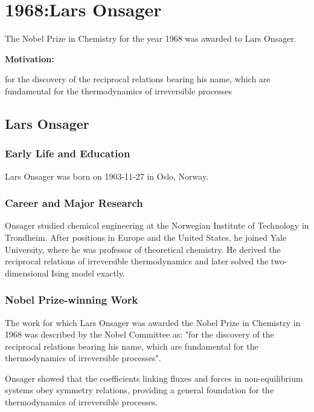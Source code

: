 \chapter{1968:Lars Onsager}

\label{chap:chemistry1968}

The Nobel Prize in Chemistry for the year 1968 was awarded to Lars Onsager.

\textbf{Motivation:}

for the discovery of the reciprocal relations bearing his name, which are fundamental for the thermodynamics of irreversible processes

\section{Lars Onsager}

\subsection*{Early Life and Education}

Lars Onsager was born on 1903-11-27 in Oslo, Norway.

\subsection*{Career and Major Research}

Onsager studied chemical engineering at the Norwegian Institute of Technology in Trondheim. After positions in Europe and the United States, he joined Yale University, where he was professor of theoretical chemistry. He derived the reciprocal relations of irreversible thermodynamics and later solved the two-dimensional Ising model exactly.

\subsection*{Nobel Prize-winning Work}

The work for which Lars Onsager was awarded the Nobel Prize in Chemistry in 1968 was described by the Nobel Committee as: "for the discovery of the reciprocal relations bearing his name, which are fundamental for the thermodynamics of irreversible processes".

Onsager showed that the coefficients linking fluxes and forces in non-equilibrium systems obey symmetry relations, providing a general foundation for the thermodynamics of irreversible processes.

